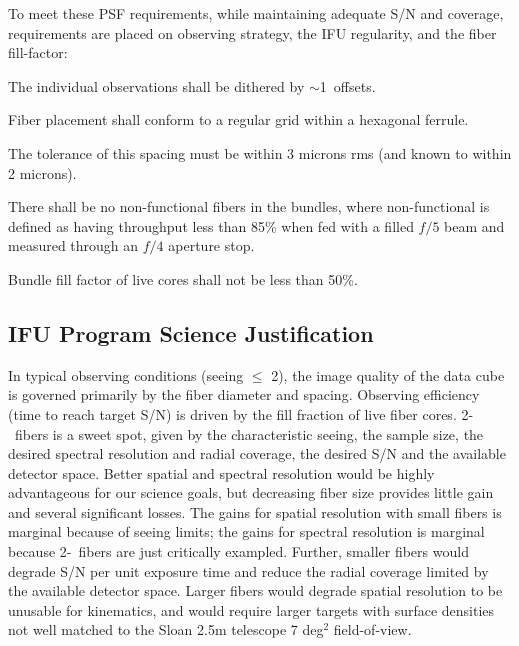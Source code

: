 \documentclass[11pt,a4paper,twoside,onecolumn,openany,final,oldfontcommands]{memoir}
\begin{document}
\medskip

\noindent To meet these PSF requirements, while maintaining adequate S/N and coverage, requirements are placed on observing strategy, the IFU regularity, and the fiber fill-factor:

\begin{requirement}

\reqitem The individual observations shall be dithered by $\sim$1\arcsec\ offsets.

\reqitem Fiber placement shall conform to a regular grid within a hexagonal ferrule.  

\reqitem The tolerance of this spacing must be within 3 microns rms (and known to within 2 microns).

\reqitem There shall be no non-functional fibers in the bundles, where non-functional is defined as having throughput less than 85\% when fed with a filled $f/5$ beam and measured through an $f/4$ aperture stop.

\reqitem Bundle fill factor of live cores shall not be less than 50\%.

\end{requirement}


\subsection{IFU Program Science Justification}

In typical observing conditions (seeing $\leq$ 2\arcsec), the image quality of the data cube is governed primarily by the fiber diameter and spacing. Observing efficiency (time to reach target S/N) is driven by the fill fraction of live fiber cores. 2-\arcsec\ fibers is a sweet spot, given by the characteristic seeing, the sample size, the desired spectral resolution and radial coverage, the desired S/N and the available detector space.  Better spatial and spectral resolution would be highly advantageous for our science goals, but decreasing fiber size provides little gain and several significant losses.  The gains for spatial resolution with small fibers is marginal because of seeing limits; the gains for spectral resolution is marginal because 2-\arcsec\ fibers are just critically exampled.  Further, smaller fibers would degrade S/N per unit exposure time and reduce the radial coverage limited by the available detector space. Larger fibers would degrade spatial resolution to be unusable for kinematics, and would require larger targets with surface densities not well matched to the Sloan 2.5m telescope 7 deg$^2$ field-of-view.
\end{document}
